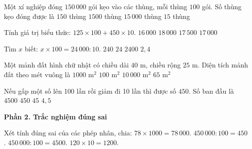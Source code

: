 \begin{ex} %
Một xí nghiệp đóng $150\,000$ gói kẹo vào các thùng, mỗi thùng $100$ gói. Số thùng kẹo đóng được là
\choice
{$150$ thùng}
{\True $1500$ thùng}
{$15\,000$ thùng}
{$15$ thùng}
\end{ex}

\begin{ex} %
Tính giá trị biểu thức: $125 \times 100 + 450 \times 10$.
\choice
{$16\,000$}
{$18\,000$}
{$17\,500$}
{\True $17\,000$}
\end{ex}

\begin{ex} %
Tìm $x$ biết: $x \times 100 = 24\,000 : 10$.
\choice
{$240$}
{\True $24$}
{$2400$}
{$2{,}4$}
\end{ex}

\begin{ex} %
Một mảnh đất hình chữ nhật có chiều dài $40\text{ m}$, chiều rộng $25\text{ m}$. Diện tích mảnh đất theo mét vuông là
\choice
{\True $1000\text{ m}^2$}
{$100\text{ m}^2$}
{$10\,000\text{ m}^2$}
{$65\text{ m}^2$}
\end{ex}

\begin{ex} %
Nếu gấp một số lên 100 lần rồi giảm đi 10 lần thì được số $450$. Số ban đầu là
\choice
{$4500$}
{$450$}
{\True $45$}
{$4{,}5$}
\end{ex}

\textbf{Phần 2. Trắc nghiệm đúng sai}

\begin{ex} %
Xét tính đúng sai của các phép nhân, chia:
\choiceTF
{\True $78 \times 1000 = 78\,000$.}
{$450\,000 : 100 = 450$.}
{\True $450\,000 : 100 = 4500$.}
{\True $120 \times 10 = 1200$.}
\end{ex}

